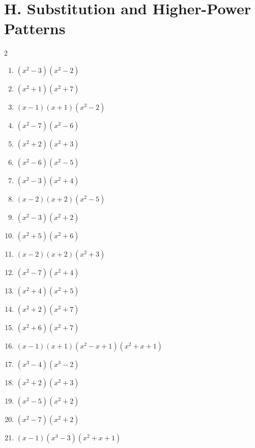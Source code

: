 \documentclass[11pt,oneside]{book}
\begin{document}
\section*{H. Substitution and Higher-Power Patterns}
\begin{multicols}{2}
\begin{enumerate}[leftmargin=*,label=\textbf{H\arabic*.},itemsep=0.45\baselineskip]
\item $ \left(x^{2} - 3\right) \left(x^{2} - 2\right) $
\item $ \left(x^{2} + 1\right) \left(x^{2} + 7\right) $
\item $ \left(x - 1\right) \left(x + 1\right) \left(x^{2} - 2\right) $
\item $ \left(x^{2} - 7\right) \left(x^{2} - 6\right) $
\item $ \left(x^{2} + 2\right) \left(x^{2} + 3\right) $
\item $ \left(x^{2} - 6\right) \left(x^{2} - 5\right) $
\item $ \left(x^{2} - 3\right) \left(x^{2} + 4\right) $
\item $ \left(x - 2\right) \left(x + 2\right) \left(x^{2} - 5\right) $
\item $ \left(x^{2} - 3\right) \left(x^{2} + 2\right) $
\item $ \left(x^{2} + 5\right) \left(x^{2} + 6\right) $
\item $ \left(x - 2\right) \left(x + 2\right) \left(x^{2} + 3\right) $
\item $ \left(x^{2} - 7\right) \left(x^{2} + 4\right) $
\item $ \left(x^{2} + 4\right) \left(x^{2} + 5\right) $
\item $ \left(x^{2} + 2\right) \left(x^{2} + 7\right) $
\item $ \left(x^{2} + 6\right) \left(x^{2} + 7\right) $
\item $ \left(x - 1\right) \left(x + 1\right) \left(x^{2} - x + 1\right) \left(x^{2} + x + 1\right) $
\item $ \left(x^{3} - 4\right) \left(x^{3} - 2\right) $
\item $ \left(x^{2} + 2\right) \left(x^{2} + 3\right) $
\item $ \left(x^{2} - 5\right) \left(x^{2} + 2\right) $
\item $ \left(x^{2} - 7\right) \left(x^{2} + 2\right) $
\item $ \left(x - 1\right) \left(x^{3} - 3\right) \left(x^{2} + x + 1\right) $

\end{enumerate}
\end{multicols}
\end{document}
